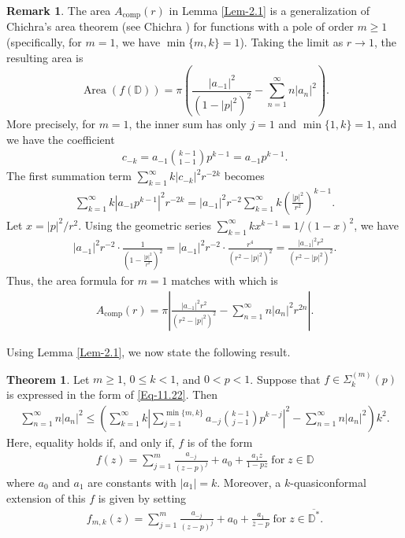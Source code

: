\documentclass[a4paper,12pt]{amsart}
\theoremstyle{plain}
\theoremstyle{definition}
\newtheorem{thm}{Theorem}[section]
\newtheorem{rem}{Remark}[section]
\begin{document}
\begin{rem}
	The area $A_{\text{comp}}(r)$ in Lemma \ref{Lem-2.1} is a {generalization of Chichra's area theorem} (see Chichra \cite{Chichra1969}) for functions with a {pole of order $m \ge 1$} (specifically, for $m=1$, we have $\min\{m, k\}=1$). Taking the limit as $r \to 1$, the resulting area is
	\begin{equation*}
		\operatorname{Area}(f(\mathbb{D})) = \pi \left(\frac{|a_{-1}|^2}{(1 - |p|^2)^{2}} - \sum_{n=1}^\infty n |a_n|^2 \right).
	\end{equation*}
	More precisely, for $m=1$, the inner sum has only $j=1$ and $\min\{1, k\} = 1$, and we have the coefficient
	\begin{align*}
		c_{-k} = a_{-1} \binom{k-1}{1-1} p^{k-1} = a_{-1} p^{k-1}.
	\end{align*}
	The first summation term $\sum_{k=1}^{\infty} k |c_{-k}|^2 r^{-2k}$ becomes
	\begin{align*}
		\sum_{k=1}^{\infty} k |a_{-1} p^{k-1}|^2 r^{-2k} = |a_{-1}|^2 r^{-2} \sum_{k=1}^{\infty} k \left(\frac{|p|^2}{r^2}\right)^{k-1}.
	\end{align*}
	Let $x = {|p|^2}/{r^2}$. Using the geometric series  $\sum_{k=1}^{\infty} k x^{k-1} = {1}/{(1-x)^2}$, we have
\begin{align*}
	|a_{-1}|^2 r^{-2} \cdot \frac{1}{\left(1-\frac{|p|^2}{r^2}\right)^2} = |a_{-1}|^2 r^{-2} \cdot \frac{r^4}{(r^2-|p|^2)^2} = \frac{|a_{-1}|^2 r^2}{(r^2-|p|^2)^2}.
\end{align*}
	Thus, the area formula for $m=1$ matches with \cite[Eq. (2.4), p. 318]{Chichra1969}  which is
	\begin{align*}
		A_{\text{comp}}(r) = \pi \left| \frac{|a_{-1}|^{2}r^{2}}{(r^{2}-|p|^{2})^{2}} - \sum_{n=1}^{\infty} n |a_{n}|^{2}r^{2n} \right|.
	\end{align*}
\end{rem}
Using Lemma \ref{Lem-2.1}, we now state the following  result.
\begin{thm}\label{Th-1.2}
	Let $m \geq 1$, $0 \leq k < 1$, and $0 < p < 1$. Suppose that $f \in \Sigma_k^{(m)}(p)$ is expressed in the form of \eqref{Eq-11.22}. Then
	\begin{align}\label{Eq-2.3}
		\sum_{n=1}^\infty n |a_n|^2 \leq \left(\sum_{k=1}^{\infty} k \left| \sum_{j=1}^{\min\{m, k\}} a_{-j} \binom{k-1}{j-1} p^{k-j} \right|^2 - \sum_{n=1}^{\infty} n |a_{n}|^2 \right)k^2.
	\end{align}
	Here, equality holds if, and only if, $f$ is of the form
 \begin{align}\label{Eq-2.4}
 		f(z) = \sum_{j=1}^{m}\frac{a_{-j}}{(z-p)^j} + a_0 + \frac{a_1 z}{1 - p z}\; \mbox{for}\; z\in\mathbb{D}
 \end{align}
where $a_0$ and $a_1$ are constants with $|a_1| = k$. Moreover, a $k $-quasiconformal extension of this $f$ is given by setting
\begin{align}\label{Eq-2.5}
	f_{m,k}(z) = \sum_{j=1}^{m}\frac{a_{-j}}{(z-p)^j} + a_0 + \frac{a_1}{\bar{z} - p}\; \mbox{for}\; z\in\overline{\mathbb{D}^*}.
\end{align}
\end{thm}
\end{document}
